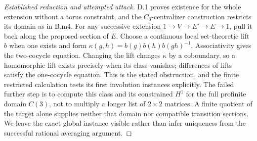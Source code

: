 \begin{proof}[Established reduction and attempted attack]
D.1 proves existence for the whole extension without a torus constraint, and the $C_3$-centralizer construction restricts its domain as in B.m4. For any successive extension $1\to V\to E'\to E\to1$, pull it back along the proposed section of $E$. Choose a continuous local set-theoretic lift $b$ when one exists and form
$\kappa(g,h)=b(g)b(h)b(gh)^{-1}$.
Associativity gives the two-cocycle equation. Changing the lift changes $\kappa$ by a coboundary, so a homomorphic lift exists precisely when its class vanishes; differences of lifts satisfy the one-cocycle equation. This is the stated obstruction, and the finite restricted calculation tests its first involution instances explicitly. The failed further step is to compute this class and its constrained $H^1$ for the full profinite domain $C(3)$, not to multiply a longer list of $2\times2$ matrices. A finite quotient of the target alone supplies neither that domain nor compatible transition sections. We leave the exact global instance visible rather than infer uniqueness from the successful rational averaging argument.
\end{proof}

